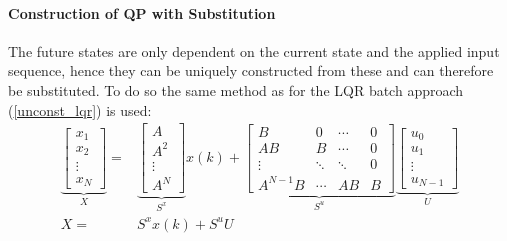 \paragraph{Construction of QP with Substitution}\label{cftoc_QP_with_subs}

The future states are only dependent on the current state and the applied input sequence, hence they can be uniquely constructed from these and can therefore be substituted. To do so the same method as for the LQR batch approach (\ref{unconst_lqr}) is used:
\begin{align*}
    \underbrace{\begin{bmatrix}
                        x_1    \\
                        x_2    \\
                        \vdots \\
                        x_N
                    \end{bmatrix}}_{X} = &
    \underbrace{\begin{bmatrix}
                        A      \\
                        A^2    \\
                        \vdots \\
                        A^N
                    \end{bmatrix}}_{S^x} x(k) +
    \underbrace{\begin{bmatrix}
                        B        & 0      & \cdots & 0 \\
                        AB       & B      & \cdots & 0 \\
                        \vdots   & \ddots & \ddots & 0 \\
                        A^{N-1}B & \cdots & AB     & B
                    \end{bmatrix}}_{S^u}
    \underbrace{\begin{bmatrix}
                        u_0    \\
                        u_1    \\
                        \vdots \\
                        u_{N-1}
                    \end{bmatrix}}_{U}                 \\
    X =                         & S^x x(k) + S^u U
\end{align*}

\newpar{}

